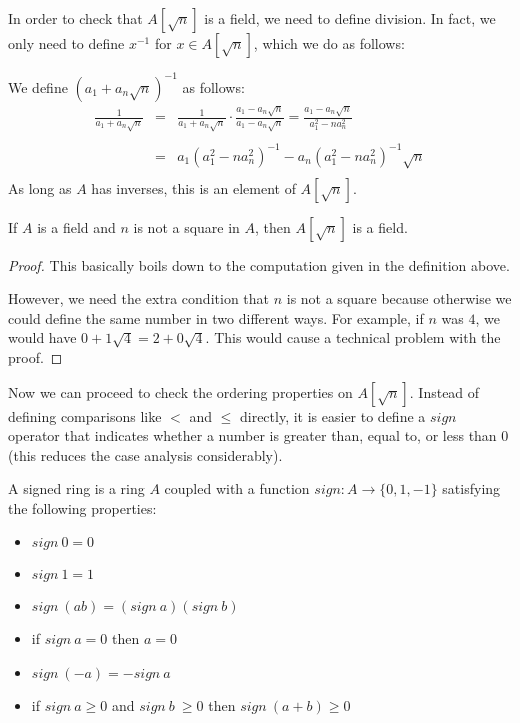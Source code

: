 In order to check that $A[\sqrt{n}]$ is a field, we need to define division. In
fact, we only need to define $x^{-1}$ for $x ∈ A[\sqrt{n}]$, which we do as
follows:

\begin{definition}
  \label{def:adjoinInv}
  \leanok
  We define $(a_1 + a_n\sqrt{n})^{-1}$ as follows:
  \begin{eqnarray*}
    \frac{1}{a_1 + a_n\sqrt{n}}
      & = & \frac{1}{a_1 + a_n\sqrt{n}} \cdot \frac{a_1 - a_n\sqrt{n}}{a_1 - a_n\sqrt{n}}
        =   \frac{a_1 - a_n\sqrt{n}}{a_1^2 - na_n^2} \\ \\
      & = & a_1(a_1^2 - na_n^2)^{-1} - a_n(a_1^2 - na_n^2)^{-1}\sqrt{n} \\
  \end{eqnarray*}
  As long as $A$ has inverses, this is an element of $A[\sqrt{n}]$.
\end{definition}

\begin{lemma}
  \label{thm:adjoinField}
  \leanok
  If $A$ is a field and $n$ is not a square in $A$, then $A[\sqrt{n}]$ is a
  field.
\end{lemma}

\begin{proof}
  This basically boils down to the computation given in the definition above.

  However, we need the extra condition that $n$ is not a square because
  otherwise we could define the same number in two different ways. For example,
  if $n$ was $4$, we would have $0 + 1\sqrt{4} = 2 + 0\sqrt{4}$. This would
  cause a technical problem with the proof.
\end{proof}


Now we can proceed to check the ordering properties on $A[\sqrt{n}]$. Instead
of defining comparisons like $<$ and $≤$ directly, it is easier to define a
$sign$ operator that indicates whether a number is greater than, equal to,
or less than 0 (this reduces the case analysis considerably).

\begin{definition}
  \label{def:signedRing}
  \leanok
  A signed ring is a ring $A$ coupled with a function $sign : A → \{0, 1, -1\}$
  satisfying the following properties: \begin{itemize}
    \item $sign~0 = 0$
    \item $sign~1 = 1$
    \item $sign~(ab) = (sign~a)(sign~b)$
    \item if $sign~a = 0$ then $a = 0$
    \item $sign~(-a) = -sign~a$
    \item if $sign~a \geq 0$ and $sign~b~\geq 0$ then $sign~(a + b) \geq 0$
  \end{itemize}
\end{definition}

